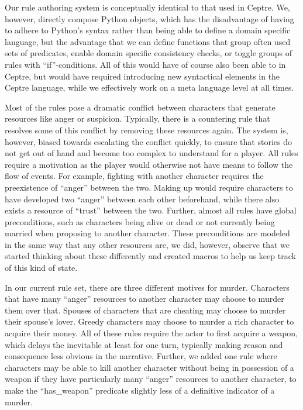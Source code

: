 Our rule authoring system is conceptually identical to that used in Ceptre. We, however, directly compose Python objects, which has the disadvantage of having to adhere to Python's syntax rather than being able to define a domain specific language, but the advantage that we can define functions that group often used sets of predicates, enable domain specific consistency checks, or toggle groups of rules with \enquote{if}-conditions. All of this would have of course also been able to in Ceptre, but would have required introducing new syntactical elements in the Ceptre language, while we effectively work on a meta language level at all times.

Most of the rules pose a dramatic conflict between characters that generate resources like anger or suspicion.
Typically, there is a countering rule that resolves some of this conflict by removing these resources again.
The system is, however, biased towards escalating the conflict quickly, to ensure that stories do not get out of hand and become too complex to understand for a player.
All rules require a motivation as the player would otherwise not have means to follow the flow of events.
For example, fighting with another character requires the preexistence of \enquote{anger} between the two.
Making up would require characters to have developed two \enquote{anger} between each other beforehand, while there also exists a resource of \enquote{trust} between the two.
Further, almost all rules have global preconditions, such as characters being alive or dead or not currently being married when proposing to another character.
These preconditions are modeled in the same way that any other resources are, we did, however, observe that we started thinking about these differently and created macros to help us keep track of this kind of state.

In our current rule set, there are three different motives for murder.
Characters that have many \enquote{anger} resources to another character may choose to murder them over that.
Spouses of characters that are cheating may choose to murder their spouse's lover.
Greedy characters may choose to murder a rich character to acquire their money.
All of these rules require the actor to first acquire a weapon, which delays the inevitable at least for one turn, typically making reason and consequence less obvious in the narrative.
Further, we added one rule where characters may be able to kill another character without being in possession of a weapon if they have particularly many \enquote{anger} resources to another character, to make the \enquote{has\_weapon} predicate slightly less of a definitive indicator of a murder.

